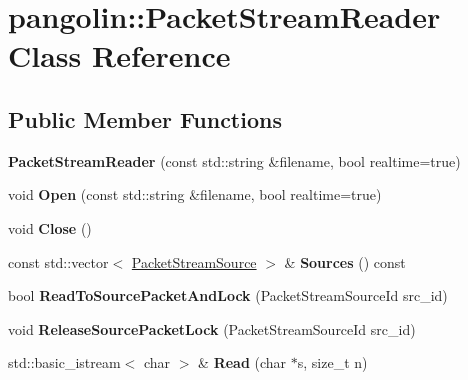 \hypertarget{classpangolin_1_1_packet_stream_reader}{}\section{pangolin\+:\+:Packet\+Stream\+Reader Class Reference}
\label{classpangolin_1_1_packet_stream_reader}
\subsection*{Public Member Functions}
\begin{DoxyCompactItemize}
\item 
{\bfseries Packet\+Stream\+Reader} (const std\+::string \&filename, bool realtime=true)\hypertarget{classpangolin_1_1_packet_stream_reader_a23167792afe67996054ba235d4037b3f}{}\label{classpangolin_1_1_packet_stream_reader_a23167792afe67996054ba235d4037b3f}

\item 
void {\bfseries Open} (const std\+::string \&filename, bool realtime=true)\hypertarget{classpangolin_1_1_packet_stream_reader_a1b331c0e8749b20e22d474d9a36f5eb3}{}\label{classpangolin_1_1_packet_stream_reader_a1b331c0e8749b20e22d474d9a36f5eb3}

\item 
void {\bfseries Close} ()\hypertarget{classpangolin_1_1_packet_stream_reader_a9779adccfba39d9284bbc0f2463a833e}{}\label{classpangolin_1_1_packet_stream_reader_a9779adccfba39d9284bbc0f2463a833e}

\item 
const std\+::vector$<$ \hyperlink{structpangolin_1_1_packet_stream_source}{Packet\+Stream\+Source} $>$ \& {\bfseries Sources} () const \hypertarget{classpangolin_1_1_packet_stream_reader_a44524078dc65d6eb3ac5af77f95ebe7e}{}\label{classpangolin_1_1_packet_stream_reader_a44524078dc65d6eb3ac5af77f95ebe7e}

\item 
bool {\bfseries Read\+To\+Source\+Packet\+And\+Lock} (Packet\+Stream\+Source\+Id src\+\_\+id)\hypertarget{classpangolin_1_1_packet_stream_reader_a4973f580b31d4fead776e58323338c31}{}\label{classpangolin_1_1_packet_stream_reader_a4973f580b31d4fead776e58323338c31}

\item 
void {\bfseries Release\+Source\+Packet\+Lock} (Packet\+Stream\+Source\+Id src\+\_\+id)\hypertarget{classpangolin_1_1_packet_stream_reader_af4cc1d531c2dcb229103e9e99994486e}{}\label{classpangolin_1_1_packet_stream_reader_af4cc1d531c2dcb229103e9e99994486e}

\item 
std\+::basic\+\_\+istream$<$ char $>$ \& {\bfseries Read} (char $\ast$s, size\+\_\+t n)\hypertarget{classpangolin_1_1_packet_stream_reader_a03aec2d97f5c5af53d0d09cbb7f5377d}{}\label{classpangolin_1_1_packet_stream_reader_a03aec2d97f5c5af53d0d09cbb7f5377d}

\end{DoxyCompactItemize}
